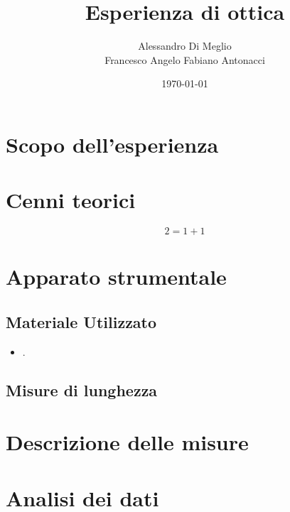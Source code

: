 \documentclass{article}
\title{Esperienza di ottica}
\author{Alessandro Di Meglio \\ Francesco Angelo Fabiano Antonacci}
\date{\today}
\begin{document}
\maketitle
\section{Scopo dell'esperienza}


\section{Cenni teorici}

	\begin{equation}
		2=1+1
			\label{eq:}
	\end{equation}




 

\section{Apparato strumentale}


\subsection{Materiale Utilizzato}


\begin{itemize}

\item .


\end{itemize} 

\subsection{Misure di lunghezza}


\section{Descrizione delle misure}


\section{Analisi dei dati}
 

\end{document}
